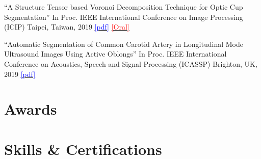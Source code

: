 \documentclass[11pt,a4paper,sans]{moderncv} %
\begin{document}
				{``A Structure Tensor based Voronoi Decomposition Technique for Optic Cup Segmentation''}
				{In Proc. IEEE International Conference on Image Processing (ICIP)}
				{Taipei, Taiwan, 2019}
				{\href{https://ieeexplore.ieee.org/document/8804286}{\textcolor{blue}{[pdf]}}
				\href{https://1drv.ms/b/s!AujsDtKxFNJCg3Fv4Gg8icPY7mMJ?e=13q3mt}{\textcolor{red}{[Oral]}}}

				{``Automatic Segmentation of Common Carotid Artery in Longitudinal Mode Ultrasound Images Using Active Oblongs''}
				{In Proc. IEEE International Conference on Acoustics, Speech and Signal Processing (ICASSP)}
				{Brighton, UK, 2019}
				{\href{https://ieeexplore.ieee.org/document/8682301}{\textcolor{blue}{[pdf]}}}


\section{Awards}



\section{Skills \& Certifications}

\end{document}
